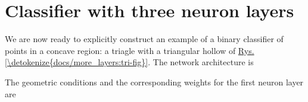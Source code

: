 \documentclass[a4paper,12pt,polish]{jupyterBook}
\begin{document}
\section{Classifier with three neuron layers}
\label{\detokenize{docs/more_layers:classifier-with-three-neuron-layers}}
\sphinxAtStartPar
We are now ready to explicitly construct an example of a binary classifier of points in a concave region: a triagle with a triangular hollow of \hyperref[\detokenize{docs/more_layers:tri-fig}]{Rys.\@ \ref{\detokenize{docs/more_layers:tri-fig}}}.
The network architecture is
\begin{sphinxVerbatimInput}

\begin{sphinxVerbatim}[commandchars=\\\{\}]
\PYG{p}{[}\PYG{p}{]}
\end{sphinxVerbatim}
\end{sphinxVerbatimInput}
\begin{sphinxVerbatimOutput}

\noindent{}
\end{sphinxVerbatimOutput}

\sphinxAtStartPar
The geometric conditions and the corresponding weights for the first neuron layer are
\end{document}
